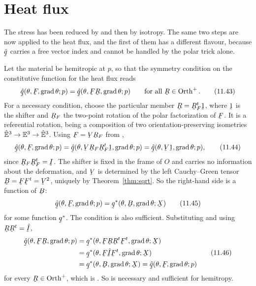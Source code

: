 \section{Heat flux}\label{sec:ch11heat}

The stress has been reduced by  and then by isotropy. The
same two steps are now applied to the heat flux, and the first of them
has a different flavour, because $\hat\bq$ carries a free vector index
and cannot be handled by the polar trick alone.

Let the material be hemitropic at $p$, so that the symmetry condition
on the constitutive function for the heat flux reads
\begin{equation}
   \hat\bq(\theta,\bF,\grad\theta;p)
   =\hat\bq(\theta,\bF\bR,\grad\theta;p)
   \qquad\text{for all }\bR\in\Orth^{+}.
   \tag{11.43}\label{eq:11.43}
\end{equation}
For a necessary condition, choose the particular member
$\bR=\bR^{t}_{F}\shift$, where $\shift$ is the shifter and $\bR_{F}$ the
two-point rotation of the polar factorization of $\bF$. It is a
referential rotation, being a composition of two orientation-preserving
isometries $\hat{\mathbb{E}}^{3}\to\mathbb{E}^{3}\to\hat{\mathbb{E}}^{3}$. Using $\bF=\bV\bR_{F}$ from ,
\begin{equation}
   \hat\bq(\theta,\bF,\grad\theta;p)
   =\hat\bq(\theta,\bV\bR_{F}\bR^{t}_{F}\shift,\grad\theta;p)
   =\hat\bq(\theta,\bV\shift,\grad\theta;p),
   \tag{11.44}\label{eq:11.44}
\end{equation}
since $\bR_{F}\bR^{t}_{F}=\I$. The shifter is fixed in the frame of $O$
and carries no information about the deformation, and $\bV$ is
determined by the left Cauchy--Green tensor $\bB=\bF\bF^{t}=\bV^{2}$,
uniquely by Theorem~\ref{thm:sqrt}. So the right-hand side is a function
of $\bB$:
\begin{equation}
   \hat\bq(\theta,\bF,\grad\theta;p)=\bq^{*}(\theta,\bB,\grad\theta;\bX)
   \tag{11.45}\label{eq:11.45}
\end{equation}
for some function $\bq^{*}$. The condition is also sufficient.
Substituting  and using $\bR\bR^{t}=\hI$,
\begin{equation}
\begin{aligned}
   \hat\bq(\theta,\bF\bR,\grad\theta;p)
   &=\bq^{*}(\theta,\bF\bR\bR^{t}\bF^{t},\grad\theta;\bX)\\
   &=\bq^{*}(\theta,\bF\hI\bF^{t},\grad\theta;\bX)\\
   &=\bq^{*}(\theta,\bB,\grad\theta;\bX)
    =\hat\bq(\theta,\bF,\grad\theta;p)
\end{aligned}
   \tag{11.46}\label{eq:11.46}
\end{equation}
for every $\bR\in\Orth^{+}$, which is . So  is
necessary and sufficient for hemitropy.

